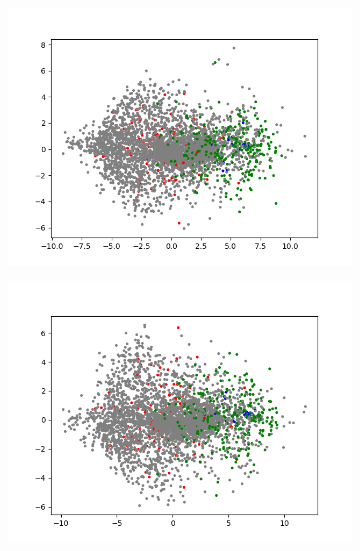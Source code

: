 \begin{figure}[H]
\begin{subfigure}{.25\textwidth}
    \end{subfigure}%
    \begin{subfigure}{.25\textwidth}
        \centering
        \includegraphics[width=\textwidth]{images/figures/experiments_latent/convolutional_dim128_PCA_classes.png}
    \end{subfigure}%
    \begin{subfigure}{.25\textwidth}
        \centering
        \includegraphics[width=\textwidth]{images/figures/experiments_latent/convolutional_dim50_PCA_classes.png}
    \end{subfigure}
    \begin{subfigure}{.25\textwidth}
        \centering

\end{subfigure}
\end{figure}
